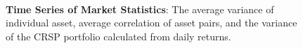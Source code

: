 \begin{landscape}
	\begin{figure}[!htb]
		\caption{{\bf Time Series of Market Statistics}: The average variance of individual asset, average correlation of asset pairs, and the variance of the CRSP portfolio calculated from daily returns.} \label{fig:0}
		\\
		
	\end{figure}
\end{landscape}
